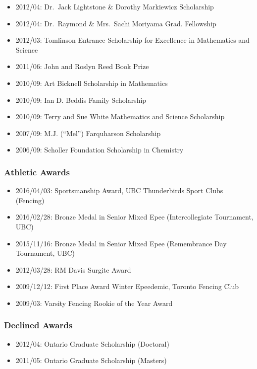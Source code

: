 \documentclass[]{article}
\providecommand{\tightlist}{%
  \setlength{\itemsep}{0pt}\setlength{\parskip}{0pt}}
\begin{document}
\begin{itemize}
\tightlist
\item
  2012/04: Dr.~Jack Lightstone \& Dorothy Markiewicz Scholarship
\item
  2012/04: Dr.~Raymond \& Mrs.~Sachi Moriyama Grad. Fellowship
\item
  2012/03: Tomlinson Entrance Scholarship for Excellence in Mathematics and Science
\item
  2011/06: John and Roslyn Reed Book Prize
\item
  2010/09: Art Bicknell Scholarship in Mathematics
\item
  2010/09: Ian D. Beddis Family Scholarship
\item
  2010/09: Terry and Sue White Mathematics and Science Scholarship
\item
  2007/09: M.J. (``Mel'') Farquharson Scholarship
\item
  2006/09: Scholler Foundation Scholarship in Chemistry
\end{itemize}

\hypertarget{athletic-awards}{%
\subsubsection{Athletic Awards}\label{athletic-awards}}

\begin{itemize}
\tightlist
\item
  2016/04/03: Sportsmanship Award, UBC Thunderbirds Sport Clubs (Fencing)
\item
  2016/02/28: Bronze Medal in Senior Mixed Epee (Intercollegiate Tournament, UBC)
\item
  2015/11/16: Bronze Medal in Senior Mixed Epee (Remembrance Day Tournament, UBC)
\item
  2012/03/28: RM Davis Surgite Award
\item
  2009/12/12: First Place Award Winter Epeedemic, Toronto Fencing Club
\item
  2009/03: Varsity Fencing Rookie of the Year Award
\end{itemize}

\hypertarget{declined-awards}{%
\subsubsection{Declined Awards}\label{declined-awards}}

\begin{itemize}
\tightlist
\item
  2012/04: Ontario Graduate Scholarship (Doctoral)
\item
  2011/05: Ontario Graduate Scholarship (Masters)
\end{itemize}
\end{document}
